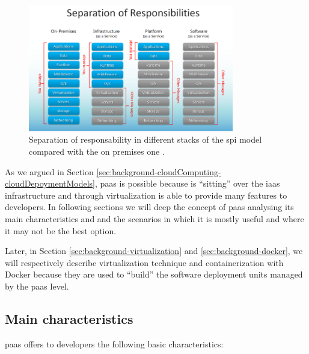 \begin{figure}
	\centering{}
	\includegraphics[width=0.8\textwidth]{chapters/background/images/separation-responsabilities.png}
	\caption[Separation of responsability in \acs{spi}]{Separation of responsability in different stacks
		of the \acf{spi} model compared with the on premises one \cite{spiRepsonabilities}.}
	\label{img:background-paas-spiResponsibilities}
\end{figure}

As we argued in Section \ref{sec:background-cloudComputing-cloudDepoymentModels}, \ac{paas} is possible
because is ``sitting'' over the \ac{iaas} infrastructure and through virtualization is able to provide many
features to developers. In following sections we will deep the concept of \ac{paas}
analysing its main characteristics and and the scenarios in which it is mostly useful and where it may not
be the best option. 

Later, in Section \ref{sec:background-virtualization} and \ref{sec:background-docker}, we will respectively
describe virtualization technique and containerization with Docker because they are used to ``build''
the software deployment units managed by the \ac{paas} level.

\subsection{Main characteristics}
\label{sec:background-paas-characteristics}
\ac{paas} offers to developers the following basic characteristics:

